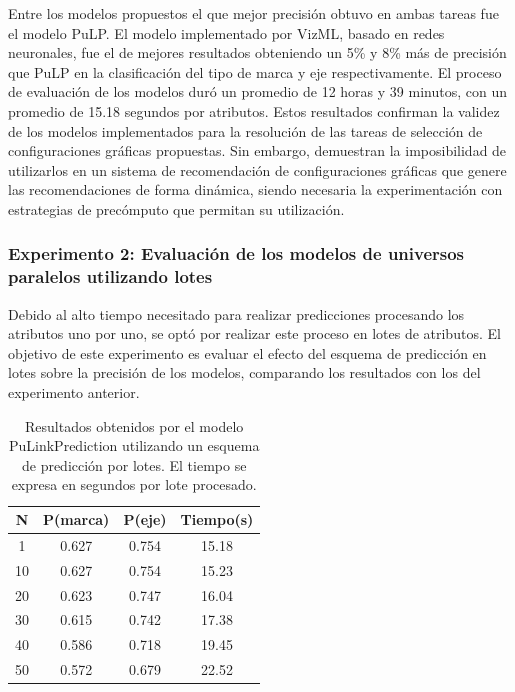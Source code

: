     Entre los modelos propuestos el que mejor precisi\'on obtuvo en ambas tareas fue el modelo PuLP. El modelo
    implementado por VizML, basado en redes neuronales, fue el de mejores resultados obteniendo un 5\% y 8\% m\'as de precisi\'on
    que PuLP en la clasificaci\'on del tipo de marca y eje respectivamente.
    El proceso de evaluaci\'on de los modelos dur\'o un promedio de
    12 horas y 39 minutos, con un promedio de 15.18 segundos por atributos. Estos
    resultados confirman la validez de los modelos implementados para la resoluci\'on de las tareas
    de selecci\'on de configuraciones gr\'aficas propuestas. Sin embargo, demuestran la imposibilidad
    de utilizarlos en un sistema de recomendaci\'on de configuraciones gr\'aficas que genere las
    recomendaciones de forma din\'amica, siendo necesaria la experimentaci\'on con estrategias
    de prec\'omputo que permitan su utilizaci\'on.

    \subsubsection{Experimento 2: Evaluaci\'on de los modelos de universos paralelos utilizando lotes}

    Debido al alto tiempo necesitado para realizar predicciones procesando
    los atributos uno por uno, se opt\'o por realizar este proceso
    en lotes de atributos. El objetivo de este experimento es
    evaluar el efecto del esquema de predicci\'on en lotes sobre la precisi\'on
    de los modelos, comparando los resultados con los del experimento anterior.

    \begin{table}[H]
        \centering
        \begin{tabular}{ |c|c|c|c|}
            \hline
            \bf N &  \bf P(marca) & \bf P(eje)& \bf Tiempo(s)\\
            \hline
            1 & 0.627 & 0.754 & 15.18 \\
            10 & 0.627&  0.754&  15.23\\
            20 & 0.623 & 0.747 & 16.04\\
            30 & 0.615  & 0.742 & 17.38\\
            40 & 0.586 & 0.718 & 19.45\\
            50 & 0.572 & 0.679 & 22.52\\
            \hline

        \end{tabular}
        \caption{Resultados obtenidos por el modelo PuLinkPrediction utilizando un
        esquema de predicci\'on por lotes. El tiempo se expresa en segundos por lote procesado.}
        \label{tab:lotes}
    \end{table}

